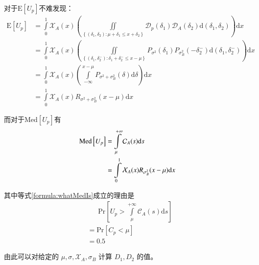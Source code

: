             对于$\mathrm{E}\left[U_p\right]$不难发现：
            \begin{align*}
                \mathrm{E}\left[U_p\right]
                &=\int\limits_0^1 \mathcal{X}_A(x)\left(\iint\limits_{\left\{(\delta_1,\delta_2):\mu+\delta_1\leq x+\delta_2\right\}} \mathcal{D}_p(\delta_1)\mathcal{D}_A(\delta_2)\mathrm{d}(\delta_1,\delta_2)\right)\mathrm{d}x \\
                &=\int\limits_0^1 \mathcal{X}_A(x)\left(\iint\limits_{\left\{(\delta_1,\delta_2^-):\delta_1+\delta_2^-\leq x-\mu\right\}} P_{\sigma^2}(\delta_1)P_{\sigma_B^2}(-\delta_2^-)\mathrm{d}(\delta_1,\delta_2^-)\right)\mathrm{d}x \\
                &=\int\limits_0^1 \mathcal{X}_A(x)\left(\int\limits_{-\infty}^{x-\mu} P_{\sigma^2+\sigma_B^2}(\delta)\mathrm{d}\delta\right)\mathrm{d}x \\
                &=\int\limits_0^1 \mathcal{X}_A(x)R_{\sigma^2+\sigma_B^2}(x-\mu) \mathrm{d}x
            \end{align*}

            而对于$\mathrm{Med}\left[U_p\right]$有
            \begin{align}
                \mathrm{Med}\left[U_p\right]
                &=\int\limits_{\mu}^{+\infty} \mathcal{C}_A(s)\mathrm{d}s \label{formula:whatMedIs}\\
                &=\int\limits_0^1 \mathcal{X}_A(x)R_{\sigma_B^2}(x-\mu) \mathrm{d}x \notag
            \end{align}

            其中等式\eqref{formula:whatMedIs}成立的理由是
            \begin{align*}
            &\phantom{=\ }\mathrm{Pr}\left[U_p>\int\limits_{\mu}^{+\infty} \mathcal{C}_A(s)\mathrm{d}s\right] \\
            &=\mathrm{Pr}\left[C_p<\mu\right] \\
            &=0.5
            \end{align*}

            由此可以对给定的 $\mu,\sigma,\mathcal{X}_A,\sigma_B$ 计算 $D_1,D_2$ 的值。

            \vspace{1.5ex}

